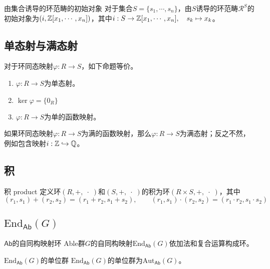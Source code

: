 \begin{proposition}{由集合诱导的环范畴的初始对象}
	对于集合$S=\{s_1,\cdots,s_n\}$，由$S$诱导的环范畴$\mathscr{R}^{S}$的初始对象为$(i,\mathbb{Z}[x_1,\cdots,x_n])$，其中$i:S\to \mathbb{Z}[x_1,\cdots,x_n],\quad s_k\mapsto x_k$。
\end{proposition}

\subsection{单态射与满态射}

\begin{proposition}
	对于环同态映射$\varphi:R\to S$，如下命题等价。
	\begin{enumerate}
		\item $\varphi:R\to S$为单态射。
		\item $\ker\varphi=\{0_R\}$
		\item $\varphi:R\to S$为单的函数映射。
	\end{enumerate}
\end{proposition}
	
\begin{proposition}
	如果环同态映射$\varphi:R\to S$为满的函数映射，那么$\varphi:R\to S$为满态射；反之不然，例如包含映射$i:\mathbb{Z}\hookrightarrow \mathbb{Q}$。
\end{proposition}

\subsection{积}

\begin{definition}{积 product}
	定义环$(R,+,\;\cdot\;)$和$(S,+,\;\cdot\;)$的积为环$(R\times S,+,\;\cdot\;)$，其中
	$$
	(r_1,s_1)+(r_2,s_2)=(r_1+r_2,s_1+s_2),\qquad 
	(r_1,s_1)\cdot (r_2,s_2)=(r_1\cdot r_2,s_1\cdot s_2)
	$$
\end{definition}

\subsection{$\mathrm{End}_{\mathsf{Ab}}(G)$}

\begin{definition}{$\mathsf{Ab}$的自同构映射环}
	Able群$G$的自同构映射$\mathrm{End}_{\mathsf{Ab}}(G)$依加法和复合运算构成环。
\end{definition}

\begin{definition}{$\mathrm{End}_{\mathsf{Ab}}(G)$的单位群}
	$\mathrm{End}_{\mathsf{Ab}}(G)$的单位群为$\mathrm{Aut}_{\mathsf{Ab}}(G)$。
\end{definition}

